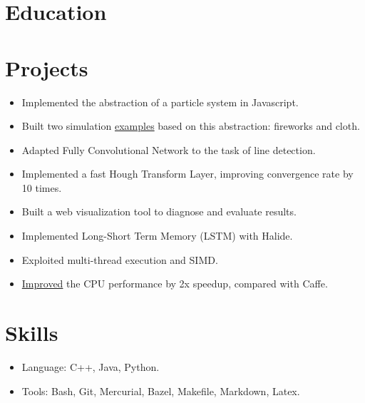 \documentclass[letterpaper,11pt]{article}
\begin{document}
\section*{Education}
\begin{itemize}
\end{itemize}

\section*{Projects}

\begin{itemize}
  \begin{itemize}
  \item Implemented the abstraction of a particle system in Javascript.
  \item Built two simulation \href{https://misaka-10032.github.io/particle-system/}{examples} based on this abstraction: fireworks and cloth.
  \end{itemize}
  \begin{itemize}
  \item Adapted Fully Convolutional Network to the task of line detection.
  \item Implemented a fast Hough Transform Layer, improving convergence rate by 10 times.
  \item Built a web visualization tool to diagnose and evaluate results.
  \end{itemize}
  \begin{itemize}
  \item Implemented Long-Short Term Memory (LSTM) with Halide.
  \item Exploited multi-thread execution and SIMD.
  \item \href{http://misaka-10032.github.io/Halstm/}{Improved} the CPU performance by 2x speedup, compared with Caffe.
  \end{itemize}
\end{itemize}

\section*{Skills}
\begin{itemize}
\item Language: C++, Java, Python.
\item Tools: Bash, Git, Mercurial, Bazel, Makefile, Markdown, Latex.
\end{itemize}
\end{document}
